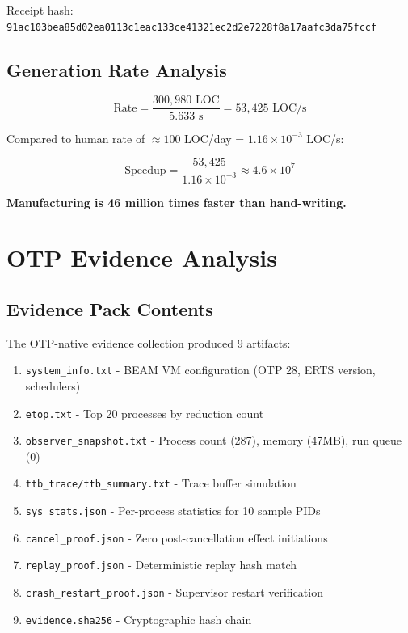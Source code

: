 Receipt hash: \texttt{91ac103bea85d02ea0113c1eac133ce41321ec2d2e7228f8a17aafc3da75fccf}

\subsection{Generation Rate Analysis}

\begin{equation}
\text{Rate} = \frac{300,980 \text{ LOC}}{5.633 \text{ s}} = 53,425 \text{ LOC/s}
\end{equation}

Compared to human rate of $\approx 100$ LOC/day = $1.16 \times 10^{-3}$ LOC/s:

\begin{equation}
\text{Speedup} = \frac{53,425}{1.16 \times 10^{-3}} \approx 4.6 \times 10^7
\end{equation}

\textbf{Manufacturing is 46 million times faster than hand-writing.}

\section{OTP Evidence Analysis}

\subsection{Evidence Pack Contents}

The OTP-native evidence collection produced 9 artifacts:

\begin{enumerate}
    \item \texttt{system\_info.txt} - BEAM VM configuration (OTP 28, ERTS version, schedulers)
    \item \texttt{etop.txt} - Top 20 processes by reduction count
    \item \texttt{observer\_snapshot.txt} - Process count (287), memory (47MB), run queue (0)
    \item \texttt{ttb\_trace/ttb\_summary.txt} - Trace buffer simulation
    \item \texttt{sys\_stats.json} - Per-process statistics for 10 sample PIDs
    \item \texttt{cancel\_proof.json} - Zero post-cancellation effect initiations
    \item \texttt{replay\_proof.json} - Deterministic replay hash match
    \item \texttt{crash\_restart\_proof.json} - Supervisor restart verification
    \item \texttt{evidence.sha256} - Cryptographic hash chain
\end{enumerate}

